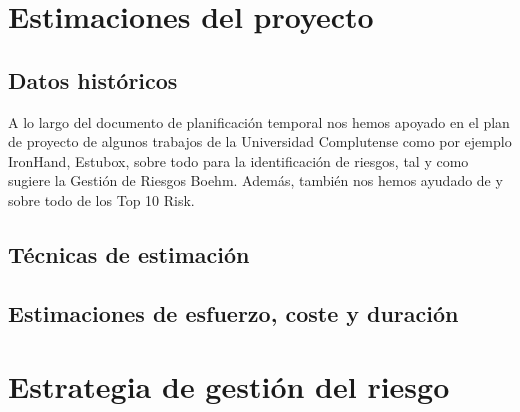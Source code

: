 \documentclass[11pt, a4paper, twoside]{report}
\begin{document}
	\section{Estimaciones del proyecto}
		\subsection{Datos históricos}
	A lo largo del documento de planificación temporal nos hemos apoyado en el plan de proyecto de algunos trabajos de la Universidad Complutense como por ejemplo IronHand, Estubox, sobre todo para la identificación de riesgos, tal y como sugiere la Gestión de Riesgos Boehm. Además, también nos hemos ayudado de \cite{PSMAN} y sobre todo de los Top 10 Risk.
		\subsection{Técnicas de estimación}
		
		\subsection{Estimaciones de esfuerzo, coste y duración}
	\section{Estrategia de gestión del riesgo}
\end{document}
